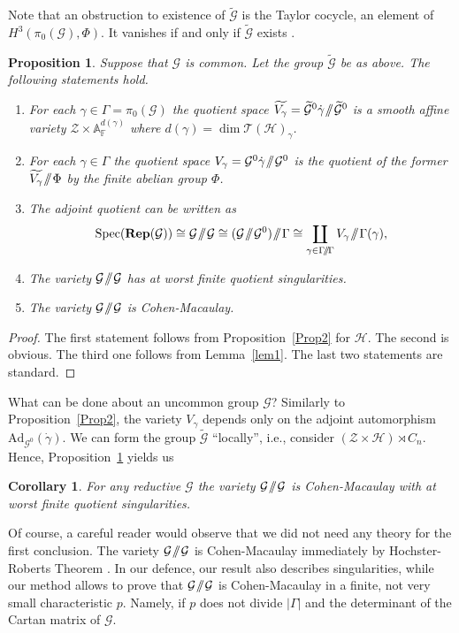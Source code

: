 \documentclass[10pt]{article}
\newcommand{\Rep}{\mathbf{Rep}}
\newtheorem{cor}{Corollary}
\newtheorem{prop}{Proposition}
\theoremstyle{definition}
\theoremstyle{remark}
\newcommand{\bA}{{\mathbb A}}
\newcommand{\bF}{{\mathbb F}}
\newcommand{\cG}{{{\mathcal G}}}
\newcommand{\cH}{{{\mathcal H}}}
\newcommand{\cT}{{{\mathcal T}}}
\newcommand{\cZ}{{{\mathcal Z}}}
\newcommand{\sslash}{\mathbin{/\mkern-6mu/}}
\newcommand{\AdRumynin}{{{\mathrm A}{\mathrm d}_{\cG^0}}}
\newcommand{\Spe}{{{\mathrm S}{\mathrm p}{\mathrm e}{\mathrm c}}}
\newcommand{\GG}{{\cG\!\sslash\! \cG}}
\newcommand{\VG}{{V_{\gamma}}}
\newcommand{\wG}{{\widetilde{\cG}}}
\begin{document}
Note that an obstruction to existence of $\wG$ is the Taylor cocycle, an element of $H^3 (\pi_0 (\cG), \Phi)$. It vanishes if and only if $\wG$ exists \cite{RVW,Tay}.

\begin{prop} \label{Prop5}
  Suppose that $\cG$ is common. Let the group $\wG$ be as above.
  The following statements hold.
  \begin{enumerate}
  \item For each $\gamma\in \Gamma = \pi_0 (\cG)$
    the quotient space $\widetilde{V_{\gamma}} = \wG^0 \dot{\gamma} \!\sslash\! \wG^{0}$
is a smooth affine variety $\cZ \times \bA^{d(\gamma)}_{\bF}$ where $d(\gamma)=\dim \cT(\cH)_\gamma$.
\item For each $\gamma\in \Gamma$
    the quotient space ${V_{\gamma}} = \cG^0 \dot{\gamma} \!\sslash\! \cG^{0}$
    is the quotient of the former $\widetilde{V_{\gamma}}\!\sslash\! \Phi$ by the finite abelian group $\Phi$.
  \item  The adjoint quotient can be written as
    \[
  \Spe (\Rep (\cG)) \cong \GG \cong (\cG\!\sslash\! \cG^0)\!\sslash\! \Gamma \cong \coprod_{\gamma \in \Gamma\!\sslash\!\Gamma} \VG\!\sslash\! \Gamma (\gamma),
  \]
\item The variety $\cG\!\sslash\! \cG$ has at worst finite quotient singularities.
\item The variety $\cG\!\sslash\! \cG$ is Cohen-Macaulay.
\end{enumerate}
\end{prop}
\begin{proof}
  The first statement follows from Proposition~\ref{Prop2} for $\cH$. The second is  obvious. The third one follows from Lemma~\ref{lem1}. 
  The last two statements are standard.
\end{proof}  

What can be done about an uncommon group $\cG$? Similarly to Proposition~\ref{Prop2}, the variety $V_{\gamma}$ depends only on the adjoint automorphism $\AdRumynin (\dot{\gamma})$. We can form the group $\wG$ ``locally'', i.e., consider $(\cZ \times \cH) \rtimes C_n$. Hence, Proposition~\ref{Prop5} yields us
\begin{cor} For any reductive $\cG$
the variety $\cG\!\sslash\! \cG$ is Cohen-Macaulay with at worst finite quotient singularities.
\end{cor}

Of course, a careful reader would observe that we did not need any theory for the first conclusion. 
The variety $\cG\!\sslash\! \cG$ is Cohen-Macaulay immediately by Hochster-Roberts Theorem \cite{HR}.
In our defence, our result also describes singularities, while our method allows to prove that 
$\cG\!\sslash\! \cG$ is Cohen-Macaulay in a finite, not very small characteristic $p$. Namely,
if $p$ does not divide $|\Gamma|$ and the determinant of the Cartan matrix of $\cG$. 
\end{document}
